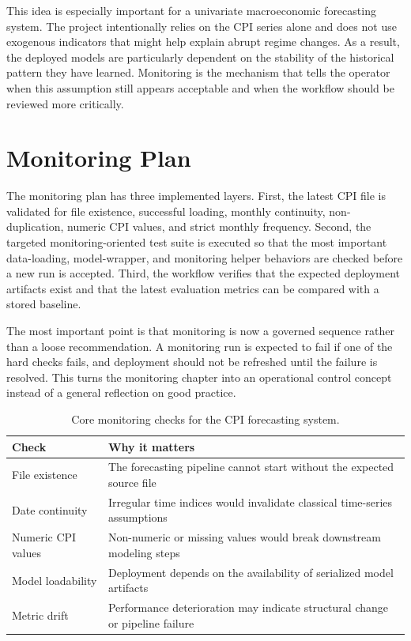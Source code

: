 This idea is especially important for a univariate macroeconomic forecasting system. The project intentionally relies on the CPI series alone and does not use exogenous indicators that might help explain abrupt regime changes. As a result, the deployed models are particularly dependent on the stability of the historical pattern they have learned. Monitoring is the mechanism that tells the operator when this assumption still appears acceptable and when the workflow should be reviewed more critically.

\section{Monitoring Plan}

The monitoring plan has three implemented layers. First, the latest CPI file is validated for file existence, successful loading, monthly continuity, non-duplication, numeric CPI values, and strict monthly frequency. Second, the targeted monitoring-oriented test suite is executed so that the most important data-loading, model-wrapper, and monitoring helper behaviors are checked before a new run is accepted. Third, the workflow verifies that the expected deployment artifacts exist and that the latest evaluation metrics can be compared with a stored baseline.

The most important point is that monitoring is now a governed sequence rather than a loose recommendation. A monitoring run is expected to fail if one of the hard checks fails, and deployment should not be refreshed until the failure is resolved. This turns the monitoring chapter into an operational control concept instead of a general reflection on good practice.

\begin{table}[htbp]
	\centering
	\caption{Core monitoring checks for the CPI forecasting system.}
	\label{tab:monitoring-checks}
	\begin{tabular}{p{4cm}p{8.5cm}}
		\hline
		Check & Why it matters \\
		\hline
		File existence & The forecasting pipeline cannot start without the expected source file \\
		Date continuity & Irregular time indices would invalidate classical time-series assumptions \\
		Numeric CPI values & Non-numeric or missing values would break downstream modeling steps \\
		Model loadability & Deployment depends on the availability of serialized model artifacts \\
		Metric drift & Performance deterioration may indicate structural change or pipeline failure \\
		\hline
	\end{tabular}
\end{table}

